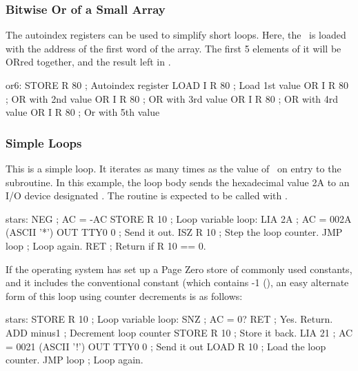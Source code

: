 \subsubsection{Bitwise Or of a Small Array}

The autoindex registers can be used to simplify short loops. Here, the
\A\ is loaded with the address of the first word of the array. The
first 5 elements of it will be ORred together, and the result left in
\A.

\begin{cftasmcode}
or6:    STORE R 80  ; Autoindex register
        LOAD I R 80 ; Load 1st value
        OR I R 80   ; OR with 2nd value
        OR I R 80   ; OR with 3rd value
        OR I R 80   ; OR with 4rd value
        OR I R 80   ; Or with 5th value
\end{cftasmcode}

\subsubsection{Simple Loops}

This is a simple loop. It iterates as many times as the value of
\A\ on entry to the subroutine. In this example, the loop body sends
the hexadecimal value {\ttfamily 2A} to an I/O device designated . The routine is expected to be called with .

\begin{cftasmcode}
stars:  NEG          ; AC = -AC
        STORE R 10   ; Loop variable
loop:   LIA 2A       ; AC = 002A (ASCII '*')
        OUT TTY0 0   ; Send it out.
        ISZ R 10     ; Step the loop counter.
        JMP loop     ; Loop again.
        RET          ; Return if R 10 == 0.
\end{cftasmcode}

If the operating system has set up a Page Zero store of commonly used
constants, and it includes the conventional constant  (which
contains -1 (), an easy alternate form of this loop using
counter decrements is as follows:

\begin{cftasmcode}
stars:  STORE R 10   ; Loop variable
loop:   SNZ          ; AC = 0?
        RET          ;   Yes. Return.
        ADD minus1   ; Decrement loop counter
        STORE R 10   ; Store it back.
        LIA 21       ; AC = 0021 (ASCII '!')
        OUT TTY0 0   ; Send it out
        LOAD R 10    ; Load the loop counter.
        JMP loop     ; Loop again.
\end{cftasmcode}

